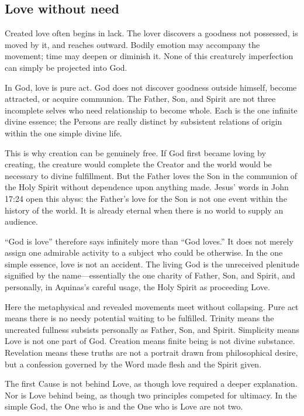 \subsection{Love without need}

Created love often begins in lack. The lover discovers a goodness not possessed, is moved by it, and reaches outward. Bodily emotion may accompany the movement; time may deepen or diminish it. None of this creaturely imperfection can simply be projected into God.

In God, love is pure act. God does not discover goodness outside himself, become attracted, or acquire communion. The Father, Son, and Spirit are not three incomplete selves who need relationship to become whole. Each is the one infinite divine essence; the Persons are really distinct by subsistent relations of origin within the one simple divine life.

This is why creation can be genuinely free. If God first became loving by creating, the creature would complete the Creator and the world would be necessary to divine fulfillment. But the Father loves the Son in the communion of the Holy Spirit without dependence upon anything made. Jesus' words in John 17:24 open this abyss: the Father's love for the Son is not one event within the history of the world. It is already eternal when there is no world to supply an audience.

``God is love'' therefore says infinitely more than ``God loves.'' It does not merely assign one admirable activity to a subject who could be otherwise. In the one simple essence, love is not an accident. The living God is the unreceived plenitude signified by the name---essentially the one charity of Father, Son, and Spirit, and personally, in Aquinas's careful usage, the Holy Spirit as proceeding Love.

Here the metaphysical and revealed movements meet without collapsing. Pure act means there is no needy potential waiting to be fulfilled. Trinity means the uncreated fullness subsists personally as Father, Son, and Spirit. Simplicity means Love is not one part of God. Creation means finite being is not divine substance. Revelation means these truths are not a portrait drawn from philosophical desire, but a confession governed by the Word made flesh and the Spirit given.

The first Cause is not behind Love, as though love required a deeper explanation. Nor is Love behind being, as though two principles competed for ultimacy. In the simple God, the One who is and the One who is Love are not two.

